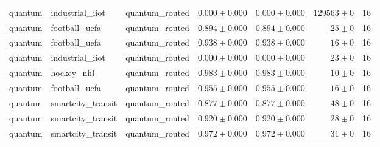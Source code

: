 \begin{table}[htbp]
\begin{tabular}{l l l r r r r}
quantum & industrial\_iiot & quantum\_routed & $0.000\pm0.000$ & $0.000\pm0.000$ & $129563\pm0$ & 16 \\
quantum & football\_uefa & quantum\_routed & $0.894\pm0.000$ & $0.894\pm0.000$ & $25\pm0$ & 16 \\
quantum & football\_uefa & quantum\_routed & $0.938\pm0.000$ & $0.938\pm0.000$ & $16\pm0$ & 16 \\
quantum & industrial\_iiot & quantum\_routed & $0.000\pm0.000$ & $0.000\pm0.000$ & $23\pm0$ & 16 \\
quantum & hockey\_nhl & quantum\_routed & $0.983\pm0.000$ & $0.983\pm0.000$ & $10\pm0$ & 16 \\
quantum & football\_uefa & quantum\_routed & $0.955\pm0.000$ & $0.955\pm0.000$ & $16\pm0$ & 16 \\
quantum & smartcity\_transit & quantum\_routed & $0.877\pm0.000$ & $0.877\pm0.000$ & $48\pm0$ & 16 \\
quantum & smartcity\_transit & quantum\_routed & $0.920\pm0.000$ & $0.920\pm0.000$ & $28\pm0$ & 16 \\
quantum & smartcity\_transit & quantum\_routed & $0.972\pm0.000$ & $0.972\pm0.000$ & $31\pm0$ & 16 \\
\hline
\end{tabular}
\end{table}
